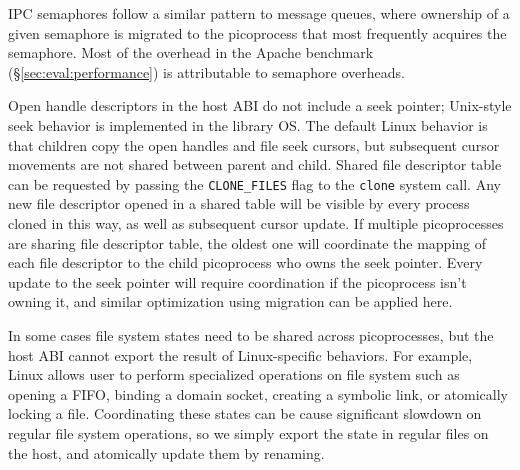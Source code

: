 
\vspace{5pt}
 IPC semaphores 
follow a similar pattern to message queues, where ownership of a given semaphore is migrated
to the picoprocess that most frequently acquires the semaphore.
Most of the overhead in the Apache benchmark (\S\ref{sec:eval:performance}) is attributable to semaphore overheads.

\vspace{5pt}
Open handle descriptors in the \sysname{} host ABI do not include a seek pointer; 
Unix-style seek behavior is implemented in the library OS.
The default Linux behavior is that children copy the open handles and file seek cursors,
but subsequent cursor movements are not shared between parent and child.
Shared file descriptor table can be requested by passing the {\tt CLONE\_FILES} flag to the {\tt clone} system call.
Any new file descriptor opened in a shared table will be visible by every process cloned in this way, as well as subsequent cursor update.
If multiple picoprocesses are sharing file descriptor table,
the oldest one will coordinate the mapping of each file descriptor to the child picoprocess who owns the seek pointer.
Every update to the seek pointer will require coordination
if the picoprocess isn't owning it,
and similar optimization using migration can be applied here. 

\vspace{5pt}
In some cases file system states need to be shared across picoprocesses,
but the host ABI cannot export the result of Linux-specific behaviors.
For example, Linux allows user to perform specialized operations on file system
such as opening a FIFO, binding a domain socket, creating a symbolic link,
or atomically locking a file.
Coordinating these states can be cause significant slowdown on regular file system operations, so we simply export the state in regular files on the host,
 and atomically update them by renaming.

